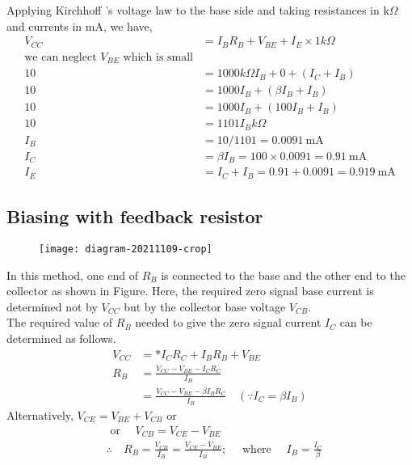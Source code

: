 \begin{answer} Applying Kirchhoff 's voltage law to the base side and taking resistances in $\mathrm{k} \Omega$ and currents in $\mathrm{mA}$, we have,	
	$$\begin{aligned}
		V_{C C} &=I_{B} R_{B}+V_{B E}+I_{E} \times 1k\Omega\\
		\text{we can neglect $V_{BE}$ which is small}\\
		10 &=1000k\Omega I_{B}+ 0+\left(I_{C}+I_{B}\right) \\
		10 &=1000 I_{B}+\left(\beta I_{B}+I_{B}\right) \\
		10 &=1000 I_{B}+\left(100 I_{B}+I_{B}\right) \\
		10 &=1101 I_{B}k\Omega \\
		I_{B} &=10 / 1101=0.0091 \mathrm{~mA} \\
		I_{C} &=\beta I_{B}=100 \times 0.0091=0.91 \mathrm{~mA} \\
		I_{E} &=I_{C}+I_{B}=0.91+0.0091=0.919 \mathrm{~mA}
	\end{aligned}$$
\end{answer}
   \subsection{Biasing with feedback resistor}
   \begin{figure}[H]
   	\centering
   	\texttt{[image: diagram-20211109-crop]}
   	\caption{}
   	\label{}
   \end{figure}
   In this method, one end of $R_{B}$ is connected to the base and the other end to the collector as shown in Figure. Here, the required zero signal base current is determined not by $V_{C C}$ but by the collector base voltage $V_{CB}$.\\
   The required value of $R_{B}$ needed to give the zero signal current $I_{C}$ can be determined as follows.
   $$
   \begin{aligned}
   V_{C C} &=* I_{C} R_{C}+I_{B} R_{B}+V_{B E} \\
   R_{B} &=\frac{V_{C C}-V_{B E}-I_{C} R_{C}}{I_{B}} \\
   &=\frac{V_{C C}-V_{B E}-\beta I_{B} R_{C}}{I_{B}} \quad\left(\because I_{C}=\beta I_{B}\right)
   \end{aligned}
   $$
   Alternatively, $V_{C E}=V_{B E}+V_{C B}$
   or
   $$
   \begin{aligned}
   &\text { or } \quad V_{C B}=V_{C E}-V_{B E} \\
   &\therefore \quad R_{B}=\frac{V_{C B}}{I_{B}}=\frac{V_{C E}-V_{B E}}{I_{B}} ; \quad \text { where } \quad I_{B}=\frac{I_{C}}{\beta}
   \end{aligned}
   $$

